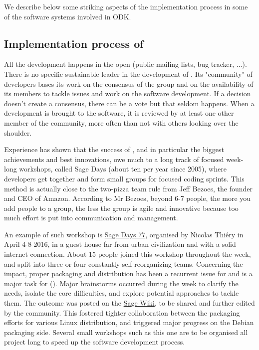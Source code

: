 \documentclass{deliverablereport}
\begin{document}
We describe below some striking aspects of the implementation process
in some of the software systems involved in ODK.

\subsection{Implementation process of \Sage}

All the development happens in the open (public mailing lists, bug
tracker, ...). There is no specific sustainable leader in the
development of \Sage. Its "community" of developers bases its work on
the consensus of the group and on the availability of its members to
tackle issues and work on the software development. If a decision
doesn't create a consensus, there can be a vote but that seldom
happens. When a development is brought to the software, it is reviewed
by at least one other member of the community, more often than not
with others looking over the shoulder.

Experience has shown that the success of \Sage, and in particular the
biggest achievements and best innovations, owe much to a long track of
focused week-long workshops, called Sage Days (about ten per year
since 2005), where developers get together and form small groups for
focused coding sprints. This method is actually close to the two-pizza
team rule from Jeff Bezoes, the founder and CEO of Amazon. According
to Mr Bezoes, beyond 6-7 people, the more you add people to a group,
the less the group is agile and innovative because too much effort is
put into communication and management.

An example of such workshop is
\href{https://wiki.sagemath.org/days77/}{Sage Days 77}, organised by
Nicolas Thiéry in April 4-8 2016, in a guest house far from urban
civilization and with a solid internet connection. About 15 people
joined this workshop throughout the week, and split into three or four
constantly self-reorganizing teams. Concerning the impact, proper
packaging and distribution has been a recurrent issue for \Sage and is
a major task for \ODK
(). Major
brainstorms occurred during the week to clarify the needs, isolate the
core difficulties, and explore potential approaches to tackle
them. The outcome was posted on the
\href{https://wiki.sagemath.org/days77/packaging}{Sage Wiki}, to be
shared and further edited by the community. This fostered tighter
collaboration between the packaging efforts for various Linux
distribution, and triggered major progress on the Debian packaging
side. Several small workshops such as this one are to be organised all
project long to speed up the software development process.
\end{document}
